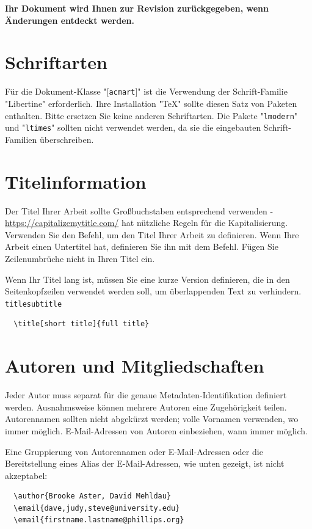 \documentclass[manuscript,screen,review]{acmart}
\begin{document}
{\bfseries Ihr Dokument wird Ihnen zur Revision zurückgegeben, wenn Änderungen entdeckt werden.}\section{Schriftarten}

Für die Dokument-Klasse "[\verb|acmart|]" ist die Verwendung der Schrift-Familie "Libertine" erforderlich. Ihre Installation "\TeX" sollte diesen Satz von Paketen enthalten. Bitte ersetzen Sie keine anderen Schriftarten. Die Pakete "\verb|lmodern|" und "\verb|ltimes|" sollten nicht verwendet werden, da sie die eingebauten Schrift-Familien überschreiben.

\section{Titelinformation}

Der Titel Ihrer Arbeit sollte Großbuchstaben entsprechend verwenden - \url{https://capitalizemytitle.com/} hat nützliche Regeln für die Kapitalisierung. Verwenden Sie den Befehl, um den Titel Ihrer Arbeit zu definieren. Wenn Ihre Arbeit einen Untertitel hat, definieren Sie ihn mit dem Befehl. Fügen Sie Zeilenumbrüche nicht in Ihren Titel ein.

Wenn Ihr Titel lang ist, müssen Sie eine kurze Version definieren, die in den Seitenkopfzeilen verwendet werden soll, um überlappenden Text zu verhindern.
{\verb|title|}{\verb|subtitle|}\begin{verbatim}
  \title[short title]{full title}
\end{verbatim}

\section{Autoren und Mitgliedschaften}

Jeder Autor muss separat für die genaue Metadaten-Identifikation definiert werden. Ausnahmsweise können mehrere Autoren eine Zugehörigkeit teilen. Autorennamen sollten nicht abgekürzt werden; volle Vornamen verwenden, wo immer möglich. E-Mail-Adressen von Autoren einbeziehen, wann immer möglich.

Eine Gruppierung von Autorennamen oder E-Mail-Adressen oder die Bereitstellung eines Alias der E-Mail-Adressen, wie unten gezeigt, ist nicht akzeptabel:
\begin{verbatim}
  \author{Brooke Aster, David Mehldau}
  \email{dave,judy,steve@university.edu}
  \email{firstname.lastname@phillips.org}
\end{verbatim}
\end{document}
